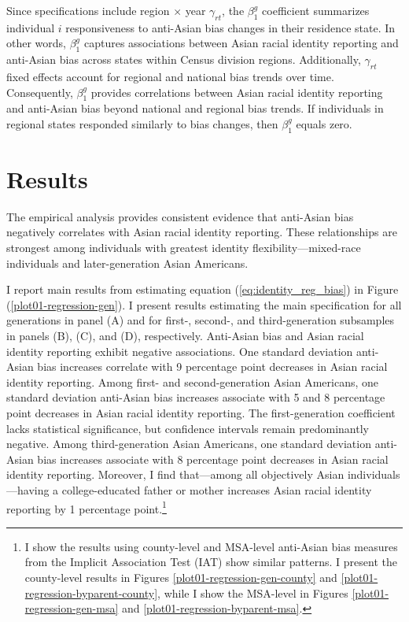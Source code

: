 Since specifications include region $\times$ year $\gamma_{rt}$, the $\beta_1^g$ coefficient summarizes individual $i$ responsiveness to anti-Asian bias changes in their residence state. In other words, $\beta_1^g$ captures associations between Asian racial identity reporting and anti-Asian bias across states within Census division regions. Additionally, $\gamma_{rt}$ fixed effects account for regional and national bias trends over time. Consequently, $\beta_1^g$ provides correlations between Asian racial identity reporting and anti-Asian bias beyond national and regional bias trends. If individuals in regional states responded similarly to bias changes, then $\beta_1^g$ equals zero.

\section{Results}\label{sec:results}

The empirical analysis provides consistent evidence that anti-Asian bias negatively correlates with Asian racial identity reporting. These relationships are strongest among individuals with greatest identity flexibility—mixed-race individuals and later-generation Asian Americans.

I report main results from estimating equation (\ref{eq:identity_reg_bias}) in Figure (\ref{plot01-regression-gen}). I present results estimating the main specification for all generations in panel (A) and for first-, second-, and third-generation subsamples in panels (B), (C), and (D), respectively. Anti-Asian bias and Asian racial identity reporting exhibit negative associations. One standard deviation anti-Asian bias increases correlate with 9 percentage point decreases in Asian racial identity reporting. Among first- and second-generation Asian Americans, one standard deviation anti-Asian bias increases associate with 5 and 8 percentage point decreases in Asian racial identity reporting. The first-generation coefficient lacks statistical significance, but confidence intervals remain predominantly negative. Among third-generation Asian Americans, one standard deviation anti-Asian bias increases associate with 8 percentage point decreases in Asian racial identity reporting. Moreover, I find that---among all objectively Asian individuals---having a college-educated father or mother increases Asian racial identity reporting by 1 percentage point.\footnote{I show the results using county-level and MSA-level anti-Asian bias measures from the Implicit Association Test (IAT) show similar patterns. I present the county-level results in Figures \ref{plot01-regression-gen-county} and \ref{plot01-regression-byparent-county}, while I show the MSA-level in Figures \ref{plot01-regression-gen-msa} and \ref{plot01-regression-byparent-msa}.}

